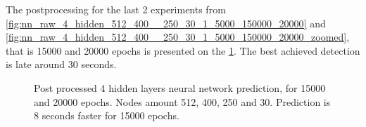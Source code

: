  The postprocessing for the last 2 experiments from \figurename{} \ref{fig:nn_raw_4_hidden_512_400__250_30_1_5000_150000_20000} and \figurename{} \ref{fig:nn_raw_4_hidden_512_400__250_30_1_5000_150000_20000_zoomed}, that is 15000 and 20000 epochs is presented on the \figurename{} \ref{fig:post_nn_raw_4_hidden_512_400__250_30_1_150000_20000.pdf}. The best achieved detection is late around 30 seconds.
\begin{figure}[H]
	\begin{center}
	\end{center}
	\caption{Post processed 4 hidden layers neural network prediction, for 15000 and 20000 epochs. Nodes amount 512, 400, 250 and 30. Prediction is 8 seconds faster for 15000 epochs.}

	\label{fig:post_nn_raw_4_hidden_512_400__250_30_1_150000_20000.pdf}
\end{figure}

\begingroup
\renewcommand{\cleardoublepage}{}
\renewcommand{\clearpage}{}
